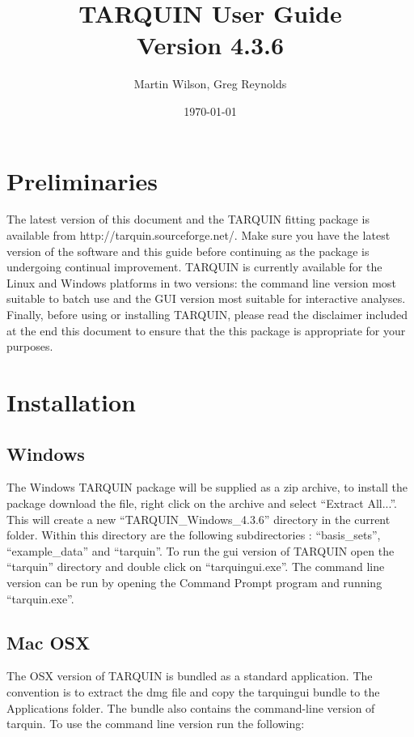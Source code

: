 \documentclass[a4paper,12pt]{article}
\newcommand{\ver}{4.3.6}
\begin{document}
\title{TARQUIN User Guide \\ Version \ver}
\author{Martin Wilson, Greg Reynolds}
\date{\today}

\maketitle

\tableofcontents

\pagebreak

\section{Preliminaries}
The latest version of this document and the TARQUIN fitting package is available from http://tarquin.sourceforge.net/. Make sure you have the latest version of the software and this guide before continuing as the package is undergoing continual improvement.  TARQUIN is currently available for the Linux and Windows platforms in two versions: the command line version most suitable to batch use and the GUI version most suitable for interactive analyses.  Finally, before using or installing TARQUIN, please read the disclaimer included at the end this document to ensure that the this package is appropriate for your purposes.

\section{Installation}
\subsection{Windows}
The Windows TARQUIN package will be supplied as a zip archive, to install the package download the file, right click on the archive and select ``Extract All...''.  This will create a new ``TARQUIN\_Windows\_\ver'' directory in the current folder.  Within this directory are the following subdirectories : ``basis\_sets'', ``example\_data'' and ``tarquin''.  To run the gui version of TARQUIN open the ``tarquin'' directory and double click on ``tarquingui.exe''.  The command line version can be run by opening the Command Prompt program and running ``tarquin.exe''.

\subsection{Mac OSX}
The OSX version of TARQUIN is bundled as a standard application. The convention is to extract the dmg file and copy the tarquingui bundle to the Applications folder. The bundle also contains the command-line version of tarquin. To use the command line version run the following:
\end{document}
